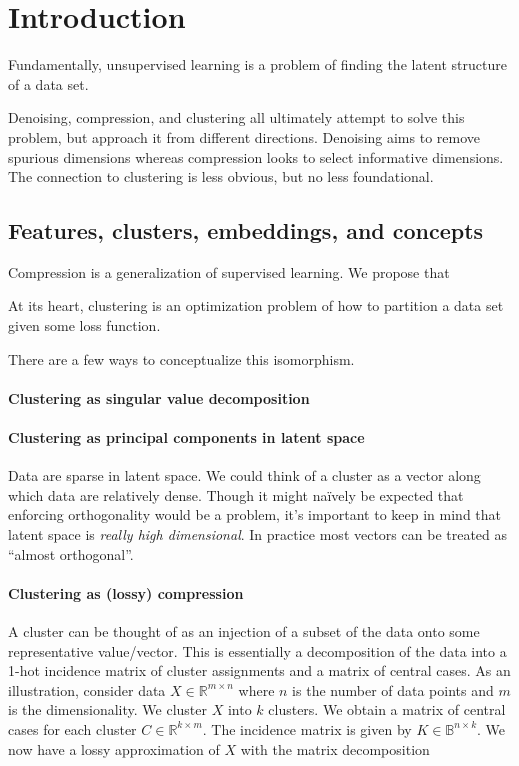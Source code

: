 \section{Introduction}

Fundamentally, unsupervised learning is a problem of finding the latent structure of a data set.

Denoising, compression, and clustering all ultimately attempt to solve this problem, but approach it from different directions.
Denoising aims to remove spurious dimensions whereas compression looks to select informative dimensions.
The connection to clustering is less obvious, but no less foundational\cite{9830658}.

\subsection{Features, clusters, embeddings, and concepts}

Compression is a generalization of supervised learning. 
We propose that 

At its heart, clustering is an optimization problem of how to partition a data set given some loss function.

There are a few ways to conceptualize this isomorphism.

\paragraph{Clustering as singular value decomposition}

\paragraph{Clustering as principal components in latent space}
Data are sparse in latent space.
We could think of a cluster as a vector along which data are relatively dense.
Though it might na\"ively be expected that enforcing orthogonality would be a problem,  
it's important to keep in mind that latent space is \textit{really high dimensional}.
In practice most vectors can be treated as ``almost orthogonal''.

\paragraph{Clustering as (lossy) compression}
A cluster can be thought of as an injection of a subset of the data onto some representative value/vector.
This is essentially a decomposition of the data into a 1-hot incidence matrix of cluster assignments and a matrix of central cases.
As an illustration, consider data $X \in \mathbb{R}^{m \times n}$ where $n$ is the number of data points and $m$ is the dimensionality.
We cluster $X$ into $k$ clusters.
We obtain a matrix of central cases for each cluster $C \in \mathbb{R}^{k \times m}$.
The incidence matrix is given by $K \in \mathbb{B}^{n \times k}$.
We now have a lossy approximation of $X$ with the matrix decomposition

